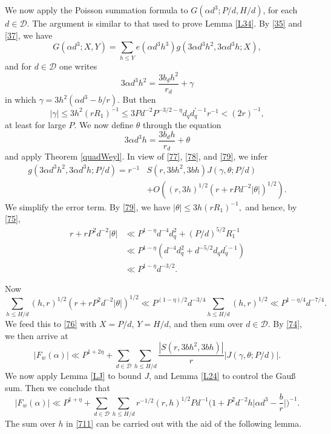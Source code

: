 \documentclass[reqno]{amsart}
\numberwithin{equation}{section}
\begin{document}
We now apply the Poisson summation formula to $G(\alpha d^3;P/d,H/d)$, for each $d \in \mathscr{D}$. The argument is similar to that used to prove Lemma \ref{L34}. By \eqref{35} and \eqref{37}, we have
\begin{equation}\label{76}G(\alpha d^3 ; X, Y) = \sum_{h \leq Y} e(\alpha d^3 h^3) g(3\alpha d^3 h^2, 3\alpha d^3 h; X),\end{equation}
and for $d \in \mathscr{D}$ one writes
\begin{equation}\label{77}3\alpha d^3 h^2 = \frac{3 b_d h^2}{r_d} + \gamma\end{equation}
in which $\gamma = 3h^2 (\alpha d^3  - b/r)$. But then
\begin{equation}\label{78}|\gamma| \leq 3h^2 (r R_1)^{-1} \leq 3P d^{-2} P^{-3/2-\eta}d_q d_q^{\prime-1}r^{-1} < (2r)^{-1},\end{equation}
at least for large $P$. We now define $\theta$ through the equation
\begin{equation}\label{79}3\alpha d^3 h = \frac{3 b_dh}{r_d} + \theta\end{equation}
and apply Theorem \ref{quadWeyl}. In view of \eqref{77}, \eqref{78}, and \eqref{79}, we infer
\begin{align*}g(3\alpha d^3 h^2, 3\alpha d^3 h; P/d)=  r^{-1} & S(r, 3 bh^2, 3bh) J(\gamma, \theta; P/d)\\& + O((r, 3h)^{1/2} (r + r P d^{-2} |\theta |)^{1/2}).\end{align*}
We simplify the error term. By \eqref{79}, we have
$|\theta| \leq 3h (r R_1)^{-1},$
and hence, by \eqref{75},
\begin{align*}r + r P^2 d^{-2} |\theta| &\ll P^{1-\eta} d^{-4} d_q^2 +(P/d)^{5/2} R_1^{-1}\\&\ll P^{1 - \eta} (d^{-4} d_q^{2}+d^{-5/2}d_q d_q^{\prime-1}) \\&\ll P^{1-\eta} d^{-3/2}.\end{align*}

Now
$$\sum_{h \leq H/d} (h,r)^{1/2}(r + r P^2 d^{-2} |\theta|)^{1/2} \ll P^{(1 - \eta)/2} d^{-3/4} \sum_{h \leq H/d} (h,r)^{1/2} \ll P^{1 - \eta/4} d^{-7/4}.$$
We feed this to \eqref{76} with $X = P/d$, $Y = H/d$, and then sum over $d \in \mathscr{D}$. By \eqref{74}, we then arrive at
$$ |F_w(\alpha)| \ll P^{1 + 2\eta} + \sum_{d \in \mathscr{D}} \sum_{h \leq H/d} \frac{|S(r, 3bh^2,3bh)|}{r}{|J(\gamma, \theta; P/d)|}.$$
We now apply Lemma \ref{LJ} to bound $J$, and Lemma \ref{L24} to control the Gau\ss{} sum. Then we conclude that
\begin{equation}\label{711}|F_w(\alpha)| \ll P^{1 + \eta} + \sum_{d \in \mathscr{D}} \sum_{h \leq H/d} r^{-1/2} (r,h)^{1/2} P d^{-1} \Big(1 + P^2 d^{-2} h \Big|\alpha d^3-\frac{b}{r}\Big|\Big)^{-1}.\end{equation}
The sum over $h$ in \eqref{711} can be carried out with the aid of the following lemma.
\end{document}

